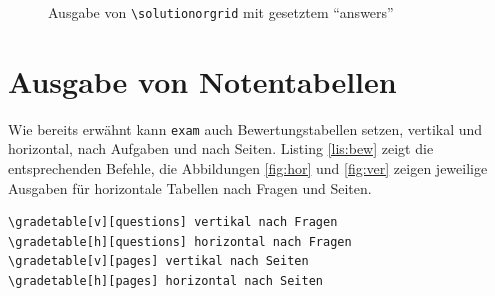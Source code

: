 \begin{figure}
\caption{Ausgabe von \texttt{\textbackslash solutionorgrid} mit gesetztem \enquote{answers}}\label{fig:solbox2}
\end{figure}


\section{Ausgabe von Notentabellen}

Wie bereits erwähnt kann \texttt{exam} auch Bewertungstabellen setzen, vertikal und horizontal, nach Aufgaben und nach Seiten. Listing \ref{lis:bew} zeigt die entsprechenden Befehle, die Abbildungen \ref{fig:hor} und \ref{fig:ver} zeigen jeweilige Ausgaben für horizontale Tabellen nach Fragen und Seiten.

\begin{lstlisting}[caption={Befehle für Bewertungstabellen},label={lis:bew}]
\gradetable[v][questions] vertikal nach Fragen
\gradetable[h][questions] horizontal nach Fragen
\gradetable[v][pages] vertikal nach Seiten
\gradetable[h][pages] horizontal nach Seiten
\end{lstlisting}

